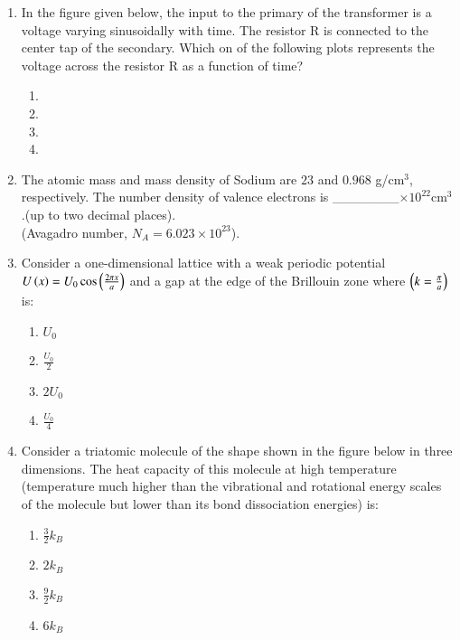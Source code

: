 \documentclass[journal,9pt,onecolumn]{IEEEtran}
\begin{document}
\begin{enumerate}
\item In the figure given below, the input to the primary of the transformer is a voltage varying sinusoidally with time. The resistor R is connected to the center tap of the secondary. Which on of the following plots represents the voltage across the resistor R as a function of time?
\begin{center}
    
\end{center}
\begin{multicols}{2}
    \begin{enumerate}
        \item 
        \item 
        \item 
        \item 
    \end{enumerate}
\end{multicols}

\item The atomic mass and mass density of Sodium are $23$ and $0.968$ g/cm$^3$, respectively. The number density of valence electrons is \_\_\_\_\_\_\_$\times10^{22}$cm$^3$.(up to two decimal places).\\
(Avagadro number, $N_A = 6.023\times10^{23}$).

\item Consider a one-dimensional lattice with a weak periodic potential $U\left(x\right) = U_{0} \cos\left(\frac{2\pi x}{a}\right)$ and a gap at the edge of the Brillouin zone where $\left(k = \frac{\pi}{a}\right)$ is:
\begin{multicols}{4}
\begin{enumerate}
    \item $U_{0}$
    \item $\frac{U_{0}}{2}$
    \item $2U_{0}$
    \item $\frac{U_{0}}{4}$
\end{enumerate}
\end{multicols}

    
\item Consider a triatomic molecule of the shape shown in the figure below in three dimensions. The heat capacity of this molecule at high temperature (temperature much higher than the vibrational and rotational energy scales of the molecule but lower than its bond dissociation energies) is:
\begin{center}
    
\end{center}
\begin{multicols}{4}
\begin{enumerate}
    \item $\frac{3}{2}k_{B}$
    \item $2k_{B}$
    \item $\frac{9}{2}k_{B}$
    \item $6k_{B}$
\end{enumerate}
\end{multicols}


\end{enumerate}
\end{document}
